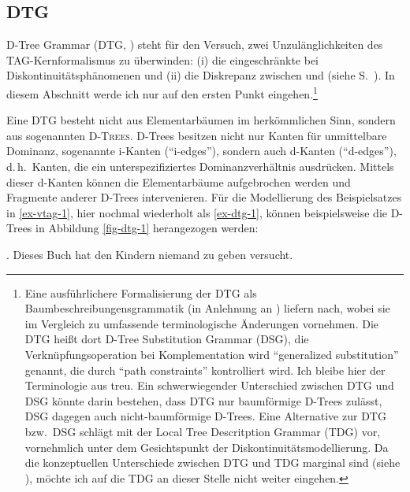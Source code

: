 \subsection{DTG} \label{sec-dtg}
\largerpage
D-Tree Grammar (DTG, \citealt{Rambow:etal:95}) steht für den Versuch, zwei Unzulänglichkeiten des TAG-Kernformalismus zu überwinden: (i) die eingeschränkte  bei Diskontinuitätsphänomenen und (ii) die Diskrepanz zwischen  und  (siehe S.~\pageref{sec-ableitungsbaum}). In diesem Abschnitt werde ich nur auf den ersten Punkt eingehen.\footnote{Eine ausführlichere Formalisierung der DTG als Baumbeschreibungensgrammatik (in Anlehnung an \citealt{Vijay-Shanker:92}) liefern \cite{Rambow:etal:01} nach, wobei sie im Vergleich zu \cite{Rambow:etal:95} umfassende terminologische Änderungen vornehmen. Die DTG hei\ss t dort D-Tree Substitution Grammar (DSG), die Verknüpfungsoperation bei Komplementation wird "`generalized substitution"' genannt, die durch "`path constraints"' kontrolliert wird. Ich bleibe hier der Terminologie aus \cite{Rambow:etal:95} treu. Ein schwerwiegender Unterschied zwischen DTG und DSG könnte darin bestehen, dass DTG nur baumförmige D-Trees zulässt, DSG dagegen auch nicht-baumförmige D-Trees. Eine Alternative zur DTG bzw.\ DSG schlägt \cite{Kallmeyer:01} mit der Local Tree Descritption Grammar (TDG) vor, vornehmlich unter dem Gesichtspunkt der Diskontinuitätsmodellierung. Da die konzeptuellen Unterschiede zwischen DTG und TDG marginal sind (siehe \citealt[118]{Rambow:etal:01}), möchte ich auf die TDG an dieser Stelle nicht weiter eingehen.}

Eine DTG besteht nicht aus Elementarbäumen im herkömmlichen Sinn, sondern aus sogenannten \textsc{D-Trees}. D-Trees besitzen nicht nur Kanten für unmittelbare Dominanz, sogenannte i-Kanten ("`i-edges"'), sondern auch d-Kanten ("`d-edges"'), d.\,h.\ Kanten, die ein unterspezifiziertes Dominanzverhältnis ausdrücken. Mittels dieser d-Kanten können die Elementarbäume aufgebrochen werden und Fragmente anderer D-Trees intervenieren. Für die Modellierung des Beispielsatzes in \ref{ex-vtag-1}, hier nochmal wiederholt als \ref{ex-dtg-1}, können beispielsweise die D-Trees in Abbildung \ref{fig-dtg-1} herangezogen werden: 

\ex. {Dieses Buch} hat {den Kindern} niemand {zu geben} versucht. \label{ex-dtg-1}


